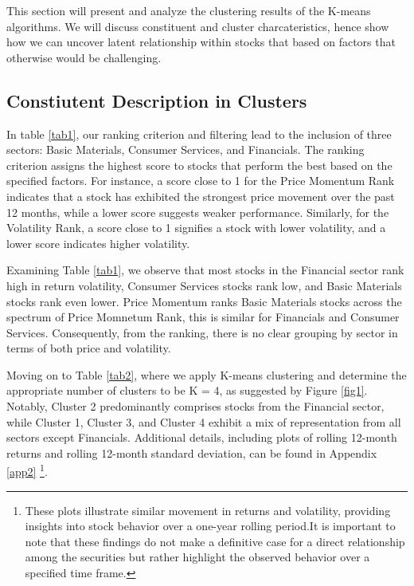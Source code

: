 \documentclass[11pt,preprint, authoryear]{elsarticle}
\numberwithin{equation}{section}
\numberwithin{figure}{section}
\numberwithin{table}{section}
\let\rmarkdownfootnote\footnote%
\def\footnote{\protect\rmarkdownfootnote}
\begin{document}
This section will present and analyze the clustering results of the
K-means algorithms. We will discuss constituent and cluster
charcateristics, hence show how we can uncover latent relationship
within stocks that based on factors that otherwise would be challenging.

\hypertarget{constiutent-description-in-clusters}{%
\subsection{Constiutent Description in
Clusters}\label{constiutent-description-in-clusters}}

In table \ref{tab1}, our ranking criterion and filtering lead to the
inclusion of three sectors: Basic Materials, Consumer Services, and
Financials. The ranking criterion assigns the highest score to stocks
that perform the best based on the specified factors. For instance, a
score close to 1 for the Price Momentum Rank indicates that a stock has
exhibited the strongest price movement over the past 12 months, while a
lower score suggests weaker performance. Similarly, for the Volatility
Rank, a score close to 1 signifies a stock with lower volatility, and a
lower score indicates higher volatility.

Examining Table \ref{tab1}, we observe that most stocks in the Financial
sector rank high in return volatility, Consumer Services stocks rank
low, and Basic Materials stocks rank even lower. Price Momentum ranks
Basic Materials stocks across the spectrum of Price Momnetum Rank, this
is similar for Financials and Consumer Services. Consequently, from the
ranking, there is no clear grouping by sector in terms of both price and
volatility.

Moving on to Table \ref{tab2}, where we apply K-means clustering and
determine the appropriate number of clusters to be K = 4, as suggested
by Figure \ref{fig1}. Notably, Cluster 2 predominantly comprises stocks
from the Financial sector, while Cluster 1, Cluster 3, and Cluster 4
exhibit a mix of representation from all sectors except Financials.
Additional details, including plots of rolling 12-month returns and
rolling 12-month standard deviation, can be found in Appendix \ref{app2}
\footnote{These plots illustrate similar movement in returns and
  volatility, providing insights into stock behavior over a one-year
  rolling period.It is important to note that these findings do not make
  a definitive case for a direct relationship among the securities but
  rather highlight the observed behavior over a specified time frame.}.
\end{document}
